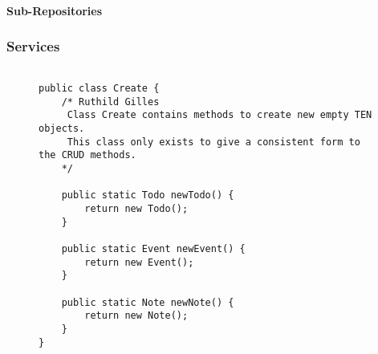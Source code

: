 		\paragraph{Sub-Repositories}
	\subsubsection{Services}
\begin{figure}[H]
\begin{lstlisting}[caption=Create (Ruthild Gilles)]

public class Create {
    /* Ruthild Gilles
     Class Create contains methods to create new empty TEN objects.
     This class only exists to give a consistent form to the CRUD methods.
    */

    public static Todo newTodo() {
        return new Todo();
    }

    public static Event newEvent() {
        return new Event();
    }

    public static Note newNote() {
        return new Note();
    }
}
\end{lstlisting}
\end{figure}

